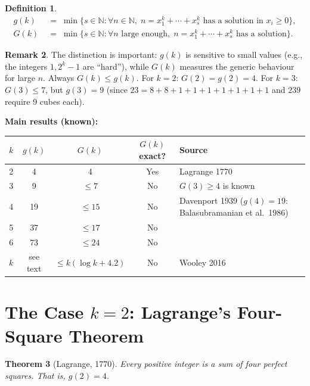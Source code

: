 \documentclass[12pt,a4paper]{amsart}
\newtheorem{theorem}{Theorem}[section]
\theoremstyle{definition}
\newtheorem{definition}[theorem]{Definition}
\newtheorem{remark}[theorem]{Remark}
\newcommand{\N}{\mathbb{N}}
\begin{document}
\begin{definition}
  \begin{align*}
    g(k) &\;=\; \min\bigl\{s \in \N : \forall n \in \N,\; n = x_1^k + \cdots + x_s^k
                             \text{ has a solution in } x_i \geq 0\bigr\}, \\
    G(k) &\;=\; \min\bigl\{s \in \N : \forall n \text{ large enough},\;
                             n = x_1^k + \cdots + x_s^k \text{ has a solution}\bigr\}.
  \end{align*}
\end{definition}

\begin{remark}
  The distinction is important: $g(k)$ is sensitive to small values
  (e.g., the integers $1, 2^k - 1$ are ``hard''), while $G(k)$ measures
  the generic behaviour for large $n$.
  Always $G(k) \leq g(k)$.  For $k = 2$: $G(2) = g(2) = 4$.
  For $k = 3$: $G(3) \leq 7$, but $g(3) = 9$ (since $23 = 8+8+1+1+1+1+1+1+1$
  and $239$ require 9 cubes each).
\end{remark}

\textbf{Main results (known):}

\begin{center}
\begin{tabular}{ccccl}
\toprule
$k$ & $g(k)$ & $G(k)$ & $G(k)$ exact? & Source \\
\midrule
2 & 4 & 4 & Yes & Lagrange 1770 \\
3 & 9 & $\leq 7$ & No & $G(3) \geq 4$ is known \\
4 & 19 & $\leq 15$ & No & Davenport 1939 ($g(4){=}19$: Balasubramanian et al.\ 1986) \\
5 & 37 & $\leq 17$ & No & \\
6 & 73 & $\leq 24$ & No & \\
$k$ & see text & $\leq k(\log k+4.2)$ & No & Wooley 2016 \\
\bottomrule
\end{tabular}
\end{center}

\section{The Case $k=2$: Lagrange's Four-Square Theorem}
\label{sec:squares}

\begin{theorem}[Lagrange, 1770]\label{thm:lagrange}
  Every positive integer is a sum of four perfect squares.  That is,
  $g(2) = 4$.
\end{theorem}
\end{document}
